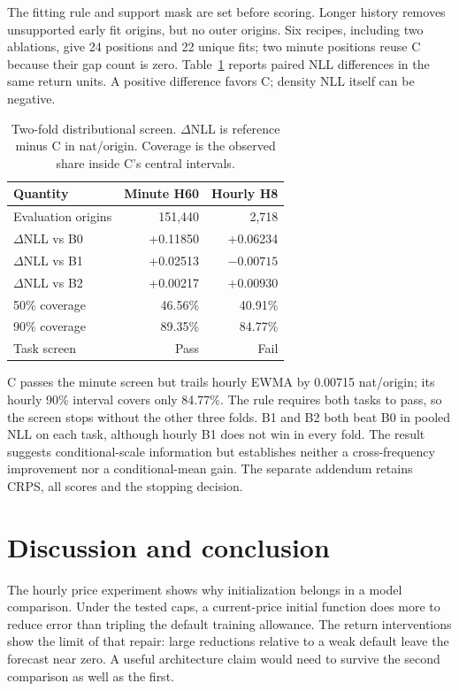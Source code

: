 The fitting rule and support mask are set before scoring. Longer history removes unsupported early fit origins, but no outer origins. Six recipes, including two ablations, give 24 positions and 22 unique fits; two minute positions reuse C because their gap count is zero. Table~\ref{tab:probability} reports paired NLL differences in the same return units. A positive difference favors C; density NLL itself can be negative.

\begin{table}[t]
\centering\small
\caption{Two-fold distributional screen. \(\Delta\)NLL is reference minus C in nat/origin. Coverage is the observed share inside C's central intervals.}\label{tab:probability}
\setlength{\tabcolsep}{4pt}
\begin{tabular}{lrr}\toprule
Quantity & Minute H60 & Hourly H8\\\midrule
Evaluation origins & 151,440 & 2,718\\
\(\Delta\)NLL vs B0 & +0.11850 & +0.06234\\
\(\Delta\)NLL vs B1 & +0.02513 & $-0.00715$\\
\(\Delta\)NLL vs B2 & +0.00217 & +0.00930\\
50\% coverage & 46.56\% & 40.91\%\\
90\% coverage & 89.35\% & 84.77\%\\
Task screen & Pass & Fail\\\bottomrule
\end{tabular}
\end{table}

C passes the minute screen but trails hourly EWMA by 0.00715 nat/origin; its hourly 90\% interval covers only 84.77\%. The rule requires both tasks to pass, so the screen stops without the other three folds. B1 and B2 both beat B0 in pooled NLL on each task, although hourly B1 does not win in every fold. The result suggests conditional-scale information but establishes neither a cross-frequency improvement nor a conditional-mean gain. The separate addendum retains CRPS, all scores and the stopping decision.

\section{Discussion and conclusion}\label{sec:discussion}

The hourly price experiment shows why initialization belongs in a model comparison. Under the tested caps, a current-price initial function does more to reduce error than tripling the default training allowance. The return interventions show the limit of that repair: large reductions relative to a weak default leave the forecast near zero. A useful architecture claim would need to survive the second comparison as well as the first.

